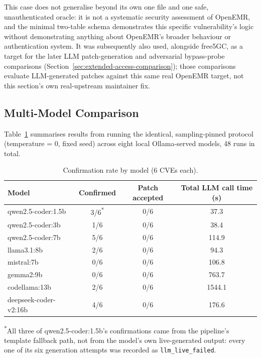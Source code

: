 \documentclass[12pt,a4paper]{report}
\begin{document}
This case does not generalise beyond its own one file and one safe, unauthenticated oracle: it is not a systematic security assessment of OpenEMR, and the minimal two-table schema demonstrates this specific vulnerability's logic without demonstrating anything about OpenEMR's broader behaviour or authentication system. It was subsequently also used, alongside free5GC, as a target for the later LLM patch-generation and adversarial bypass-probe comparisons (Section~\ref{sec:extended-access-comparison}); those comparisons evaluate LLM-generated patches against this same real OpenEMR target, not this section's own real-upstream maintainer fix.

\subsection{Multi-Model Comparison}
\label{sec:multi-model-comparison}

Table~\ref{tab:multi-model} summarises results from running the identical, sampling-pinned protocol (temperature = 0, fixed seed) across eight local Ollama-served models, 48 runs in total.

\begin{table}[H]
\centering
\caption{Confirmation rate by model (6 CVEs each).}
\label{tab:multi-model}
\begin{tabular}{@{}lccc@{}}
\toprule
\textbf{Model} & \textbf{Confirmed} & \textbf{Patch accepted} & \textbf{Total LLM call time (s)} \\
\midrule
qwen2.5-coder:1.5b & 3/6\textsuperscript{*} & 0/6 & 37.3 \\
qwen2.5-coder:3b & 1/6 & 0/6 & 38.4 \\
qwen2.5-coder:7b & 5/6 & 0/6 & 114.9 \\
llama3.1:8b & 2/6 & 0/6 & 94.3 \\
mistral:7b & 0/6 & 0/6 & 106.8 \\
gemma2:9b & 0/6 & 0/6 & 763.7 \\
codellama:13b & 2/6 & 0/6 & 1544.1 \\
deepseek-coder-v2:16b & 4/6 & 0/6 & 176.6 \\
\bottomrule
\end{tabular}
\end{table}

\noindent\textsuperscript{*}All three of qwen2.5-coder:1.5b's confirmations came from the pipeline's template fallback path, not from the model's own live-generated output: every one of its six generation attempts was recorded as \texttt{llm\_live\_failed}.
\end{document}

